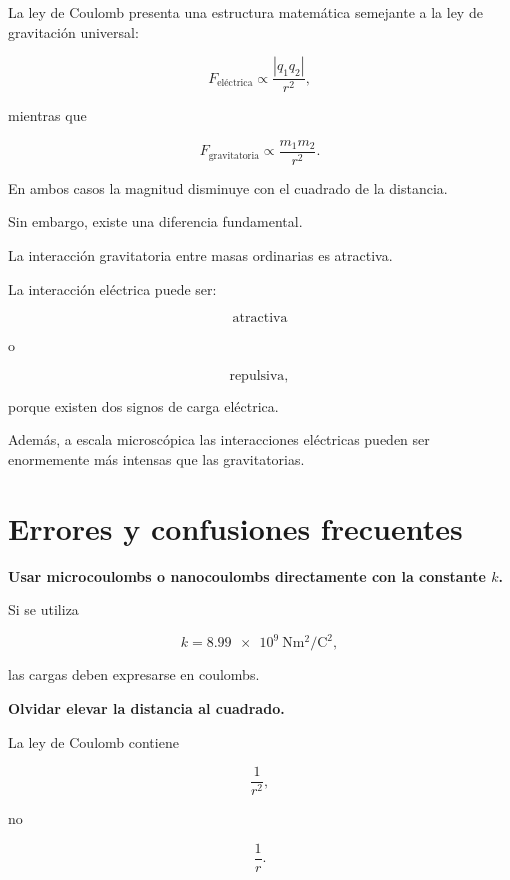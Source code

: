 La ley de Coulomb presenta una estructura matemática semejante a la ley de
gravitación universal:

\[
F_{\text{eléctrica}}
\propto
\frac{|q_1q_2|}{r^2},
\]

mientras que

\[
F_{\text{gravitatoria}}
\propto
\frac{m_1m_2}{r^2}.
\]

En ambos casos la magnitud disminuye con el cuadrado de la distancia.

Sin embargo, existe una diferencia fundamental.

La interacción gravitatoria entre masas ordinarias es atractiva.

La interacción eléctrica puede ser:

\[
\boxed{\text{atractiva}}
\]

o

\[
\boxed{\text{repulsiva}},
\]

porque existen dos signos de carga eléctrica.

Además, a escala microscópica las interacciones eléctricas pueden ser
enormemente más intensas que las gravitatorias.



\section{Errores y confusiones frecuentes}

\begin{errorfrecuente}

\textbf{Usar microcoulombs o nanocoulombs directamente con la constante
\(k\).}

Si se utiliza

\[
k=
\SI{8.99e9}{\newton\metre\squared\per\coulomb\squared},
\]

las cargas deben expresarse en coulombs.

\end{errorfrecuente}


\begin{errorfrecuente}

\textbf{Olvidar elevar la distancia al cuadrado.}

La ley de Coulomb contiene

\[
\frac{1}{r^2},
\]

no

\[
\frac{1}{r}.
\]

\end{errorfrecuente}


